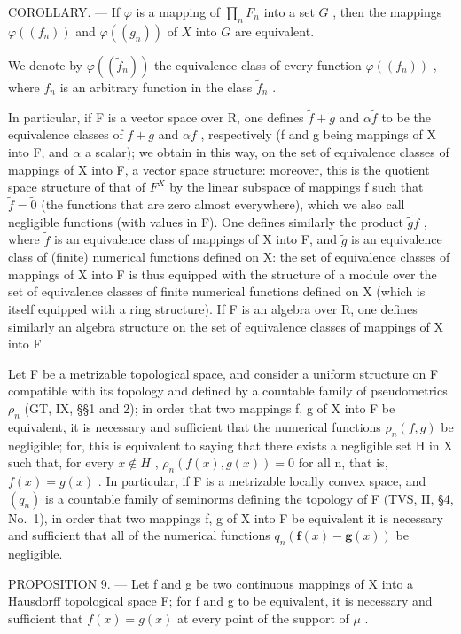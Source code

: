 COROLLARY. --- If \(\varphi\) is a mapping of \(\prod_{n} F_n\) into a set \(G\) , then the mappings \(\varphi((f_n))\) and \(\varphi((g_n))\) of \(X\) into \(G\) are equivalent.

We denote by \(\varphi((\widetilde{f}_n))\) the equivalence class of every function \(\varphi((f_n))\) , where \(f_n\) is an arbitrary function in the class \(\widetilde{f}_n\) .

In particular, if F is a vector space over R, one defines \(\widetilde{f} + \widetilde{g}\) and \(\alpha\widetilde{f}\) to be the equivalence classes of \(f + g\) and \(\alpha f\) , respectively (f and g being mappings of X into F, and \(\alpha\) a scalar); we obtain in this way, on the set of equivalence classes of mappings of X into F, a vector space structure: moreover, this is the quotient space structure of that of \(F^{X}\) by the linear subspace of mappings f such that \(\widetilde{f} = \widetilde{0}\) (the functions that are zero almost everywhere), which we also call negligible functions (with values in F). One defines similarly the product \(\widetilde{g}\widetilde{f}\) , where \(\widetilde{f}\) is an equivalence class of mappings of X into F, and \(\widetilde{g}\) is an equivalence class of (finite) numerical functions defined on X: the set of equivalence classes of mappings of X into F is thus equipped with the structure of a module over the set of equivalence classes of finite numerical functions defined on X (which is itself equipped with a ring structure). If F is an algebra over R, one defines similarly an algebra structure on the set of equivalence classes of mappings of X into F.

Let F be a metrizable topological space, and consider a uniform structure on F compatible with its topology and defined by a countable family of pseudometrics \(\rho_{n}\) (GT, IX, §§1 and 2); in order that two mappings f, g of X into F be equivalent, it is necessary and sufficient that the numerical functions \(\rho_{n}(f,g)\) be negligible; for, this is equivalent to saying that there exists a negligible set H in X such that, for every \(x\notin H\) , \(\rho_{n}(f(x),g(x))=0\) for all n, that is, \(f(x)=g(x)\) . In particular, if F is a metrizable locally convex space, and \((q_{n})\) is a countable family of seminorms defining the topology of F (TVS, II, §4, No.~1), in order that two mappings f, g of X into F be equivalent it is necessary and sufficient that all of the numerical functions \(q_{n}(\mathbf{f}(x)-\mathbf{g}(x))\) be negligible.

PROPOSITION 9. --- Let f and g be two continuous mappings of X into a Hausdorff topological space F; for f and g to be equivalent, it is necessary and sufficient that \(f(x) = g(x)\) at every point of the support of \(\mu\) .

